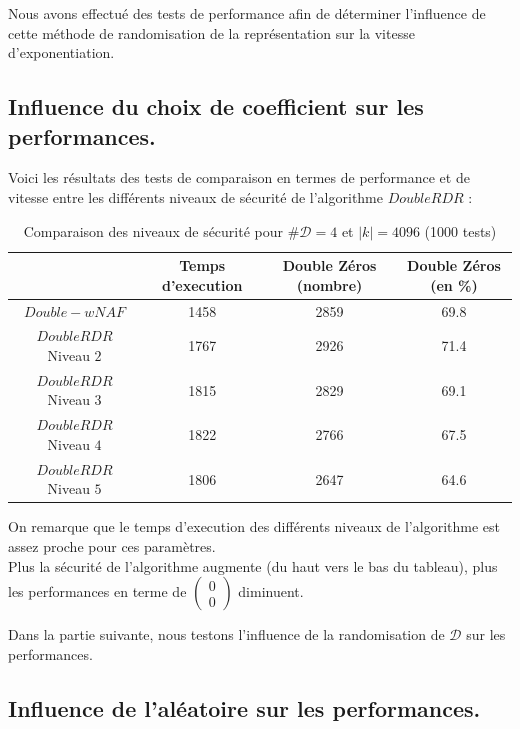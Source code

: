 \documentclass[12pt, a4paper]{memoir}
\newcommand{\doublezero}{\begin{pmatrix} 0 \\ 0 \end{pmatrix}}
\begin{document}
  Nous avons effectué des tests de performance afin de déterminer l'influence de cette méthode de randomisation de la 
  représentation sur la vitesse d'exponentiation.
  
  \subsection{Influence du choix de coefficient sur les performances.}

  Voici les résultats des tests de comparaison en termes de performance et de vitesse entre les différents
  niveaux de sécurité de l'algorithme $DoubleRDR$ :
\begin{table}[htbp]
\caption{Comparaison des niveaux de sécurité pour $\#\mathcal{D} = 4$ et $|k| = 4096$ (1000 tests) }
\begin{center}
\begin{tabular}{cccc}
\toprule
\, & Temps d'execution & Double Zéros (nombre) & Double Zéros (en \%) \\
\midrule
$Double-wNAF$ & 1458 & 2859  & 69.8 \\
$DoubleRDR$ Niveau $2$ & 1767 & 2926 & 71.4 \\
$DoubleRDR$ Niveau $3$ & 1815 & 2829 & 69.1 \\
$DoubleRDR$ Niveau $4$ & 1822 & 2766 & 67.5 \\
$DoubleRDR$ Niveau $5$ & 1806 & 2647 & 64.6 \\
\bottomrule
\end{tabular}
\end{center}
\label{tab:example}
\end{table}%

On remarque que le temps d'execution des différents niveaux de l'algorithme est assez proche pour ces paramètres. \\
Plus la sécurité de l'algorithme augmente (du haut vers le bas du tableau), plus les performances en terme
de $\doublezero$ diminuent.

Dans la partie suivante, nous testons l'influence de la randomisation de $\mathcal{D}$ sur les performances.

  \subsection{Influence de l'aléatoire sur les performances.}
\end{document}
